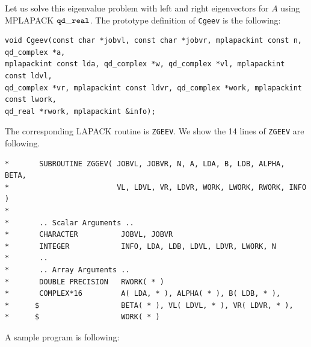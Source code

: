 \documentclass[12pt]{article}
\begin{document}
Let us solve this eigenvalue problem with left and right eigenvectors for $A$ using MPLAPACK $\tt qd\_real$.
The prototype definition of {\tt Cgeev} is the following:
\begin{verbatim}
void Cgeev(const char *jobvl, const char *jobvr, mplapackint const n, qd_complex *a,
mplapackint const lda, qd_complex *w, qd_complex *vl, mplapackint const ldvl,
qd_complex *vr, mplapackint const ldvr, qd_complex *work, mplapackint const lwork,
qd_real *rwork, mplapackint &info);
\end{verbatim}
The corresponding LAPACK routine is {\tt ZGEEV}. We show the 14 lines of {\tt ZGEEV} are following.
\begin{verbatim}
*       SUBROUTINE ZGGEV( JOBVL, JOBVR, N, A, LDA, B, LDB, ALPHA, BETA,
*                         VL, LDVL, VR, LDVR, WORK, LWORK, RWORK, INFO )
*
*       .. Scalar Arguments ..
*       CHARACTER          JOBVL, JOBVR
*       INTEGER            INFO, LDA, LDB, LDVL, LDVR, LWORK, N
*       ..
*       .. Array Arguments ..
*       DOUBLE PRECISION   RWORK( * )
*       COMPLEX*16         A( LDA, * ), ALPHA( * ), B( LDB, * ),
*      $                   BETA( * ), VL( LDVL, * ), VR( LDVR, * ),
*      $                   WORK( * )

\end{verbatim}
A sample program is following:
\end{document}
